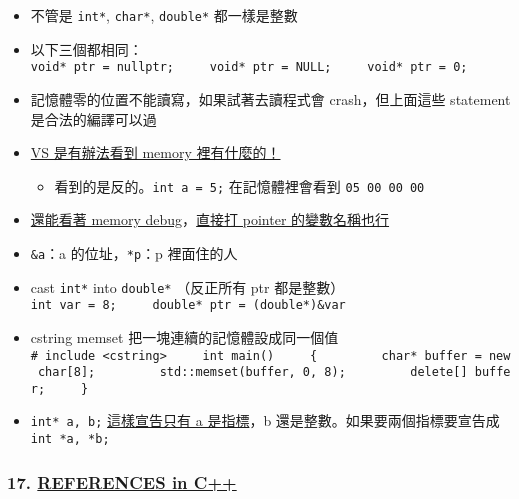 \documentclass[11pt]{article}
\providecommand{\tightlist}{%
      \setlength{\itemsep}{0pt}\setlength{\parskip}{0pt}}
\begin{document}
\begin{itemize}
\tightlist
\item
  不管是 \texttt{int*}, \texttt{char*}, \texttt{double*} 都一樣是整數
\item
  以下三個都相同：
  \texttt{void*\ ptr\ =\ nullptr;\ \ \ \ \ void*\ ptr\ =\ NULL;\ \ \ \ \ void*\ ptr\ =\ 0;}
\item
  記憶體零的位置不能讀寫，如果試著去讀程式會 crash，但上面這些 statement
  是合法的編譯可以過
\item
  \href{https://youtu.be/DTxHyVn0ODg?list=PLlrATfBNZ98dudnM48yfGUldqGD0S4FFb\&t=412}{VS
  是有辦法看到 memory 裡有什麼的！}

  \begin{itemize}
  \tightlist
  \item
    看到的是反的。\texttt{int\ a\ =\ 5;} 在記憶體裡會看到
    \texttt{05\ 00\ 00\ 00}
  \end{itemize}
\item
  \href{https://youtu.be/DTxHyVn0ODg?list=PLlrATfBNZ98dudnM48yfGUldqGD0S4FFb\&t=668}{還能看著
  memory
  debug}，\href{https://youtu.be/DTxHyVn0ODg?list=PLlrATfBNZ98dudnM48yfGUldqGD0S4FFb\&t=808}{直接打
  pointer 的變數名稱也行}
\item
  \texttt{\&a}：a 的位址，\texttt{*p}：p 裡面住的人
\item
  cast \texttt{int*} into \texttt{double*} （反正所有 ptr 都是整數）
  \texttt{int\ var\ =\ 8;\ \ \ \ \ double*\ ptr\ =\ (double*)\&var}
\item
  cstring memset 把一塊連續的記憶體設成同一個值
  \texttt{\#\ include\ \textless{}cstring\textgreater{}\ \ \ \ \ int\ main()\ \ \ \ \ \{\ \ \ \ \ \ \ \ \ char*\ buffer\ =\ new\ char{[}8{]};\ \ \ \ \ \ \ \ \ std::memset(buffer,\ 0,\ 8);\ \ \ \ \ \ \ \ \ delete{[}{]}\ buffer;\ \ \ \ \ \}}
\item
  \texttt{int*\ a,\ b;}
  \href{https://youtu.be/4fJBrditnJU?list=PLlrATfBNZ98dudnM48yfGUldqGD0S4FFb\&t=470}{這樣宣告只有
  a 是指標}，b 還是整數。如果要兩個指標要宣告成 \texttt{int\ *a,\ *b;}
\end{itemize}

\hypertarget{references-in-c}{%
\subsubsection{\texorpdfstring{17.
\href{https://www.youtube.com/watch?v=IzoFn3dfsPA\&list=PLlrATfBNZ98dudnM48yfGUldqGD0S4FFb\&index=17}{REFERENCES
in C++}}{17. REFERENCES in C++}}\label{references-in-c}}
\end{document}

